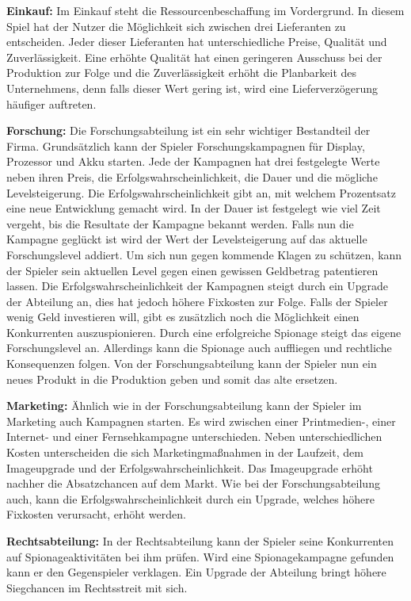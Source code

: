 \textbf{Einkauf:} 
Im Einkauf steht die Ressourcenbeschaffung im Vordergrund. In diesem Spiel hat der Nutzer die Möglichkeit sich zwischen drei Lieferanten zu entscheiden. Jeder dieser Lieferanten hat unterschiedliche Preise, Qualität und Zuverlässigkeit. Eine erhöhte Qualität hat einen geringeren Ausschuss bei der Produktion zur Folge und die Zuverlässigkeit erhöht die Planbarkeit des Unternehmens, denn falls dieser Wert gering ist, wird eine Lieferverzögerung häufiger auftreten.

\textbf{Forschung:} 
Die Forschungsabteilung ist ein sehr wichtiger Bestandteil der Firma. Grundsätzlich kann der Spieler Forschungskampagnen für Display, Prozessor und Akku starten. Jede der Kampagnen hat drei festgelegte Werte neben ihren Preis, die Erfolgswahrscheinlichkeit, die Dauer und die mögliche Levelsteigerung. Die Erfolgswahrscheinlichkeit gibt an, mit welchem Prozentsatz  eine neue Entwicklung gemacht wird. In der Dauer ist festgelegt wie viel Zeit vergeht, bis die Resultate der Kampagne bekannt werden. Falls nun die Kampagne geglückt ist wird der Wert der Levelsteigerung auf das aktuelle Forschungslevel addiert. Um sich nun gegen kommende Klagen zu schützen, kann der Spieler sein aktuellen Level gegen einen gewissen Geldbetrag patentieren lassen. Die Erfolgswahrscheinlichkeit der Kampagnen steigt durch ein Upgrade der Abteilung an, dies hat jedoch höhere Fixkosten zur Folge. Falls der Spieler wenig Geld investieren will, gibt es zusätzlich noch die Möglichkeit einen Konkurrenten auszuspionieren. Durch eine erfolgreiche Spionage steigt das eigene Forschungslevel an. Allerdings kann die Spionage auch auffliegen und rechtliche Konsequenzen folgen. Von der Forschungsabteilung kann der Spieler nun ein neues Produkt in die Produktion geben und somit das alte ersetzen.

\textbf{Marketing: }
Ähnlich wie in der Forschungsabteilung kann der Spieler im Marketing auch Kampagnen starten. Es wird zwischen einer Printmedien-, einer Internet- und einer Fernsehkampagne unterschieden. Neben unterschiedlichen Kosten unterscheiden die sich Marketingmaßnahmen in der Laufzeit, dem Imageupgrade und der Erfolgswahrscheinlichkeit. Das Imageupgrade erhöht nachher die Absatzchancen auf dem Markt. Wie bei der Forschungsabteilung auch, kann die Erfolgswahrscheinlichkeit durch ein Upgrade, welches höhere Fixkosten verursacht, erhöht werden.

\textbf{Rechtsabteilung:} 
In der Rechtsabteilung kann der Spieler seine Konkurrenten auf Spionageaktivitäten bei ihm prüfen. Wird eine Spionagekampagne gefunden kann er den Gegenspieler verklagen. Ein Upgrade der Abteilung bringt höhere Siegchancen im Rechtsstreit mit sich.

